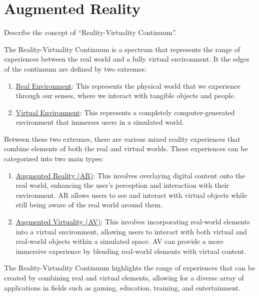 \section{Augmented Reality}

\begin{ejercicio}
    Describe the concept of ``Reality-Virtuality Continuum''.

    The Reality-Virtuality Continuum is a spectrum that represents the range of experiences between the real world and a fully virtual environment. It the edges of the continuum are defined by two extremes:
    \begin{enumerate}
        \item \ul{Real Environment}: This represents the physical world that we experience through our senses, where we interact with tangible objects and people.
        \item \ul{Virtual Environment}: This represents a completely computer-generated environment that immerses users in a simulated world.
    \end{enumerate}

    Between these two extremes, there are various mixed reality experiences that combine elements of both the real and virtual worlds. These experiences can be categorized into two main types:
    \begin{enumerate}
        \item \ul{Augmented Reality (AR)}: This involves overlaying digital content onto the real world, enhancing the user's perception and interaction with their environment. AR allows users to see and interact with virtual objects while still being aware of the real world around them.
        \item \ul{Augmented Virtuality (AV)}: This involves incorporating real-world elements into a virtual environment, allowing users to interact with both virtual and real-world objects within a simulated space. AV can provide a more immersive experience by blending real-world elements with virtual content.
    \end{enumerate}
    The Reality-Virtuality Continuum highlights the range of experiences that can be created by combining real and virtual elements, allowing for a diverse array of applications in fields such as gaming, education, training, and entertainment.
\end{ejercicio}

